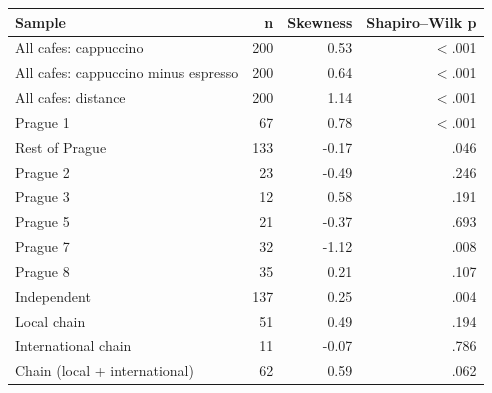 \begin{tabular}{lrrr}
  \toprule
Sample & n & Skewness & Shapiro--Wilk p \\ 
  \midrule
All cafes: cappuccino & 200 & 0.53 & $<$.001 \\ 
  All cafes: cappuccino minus espresso & 200 & 0.64 & $<$.001 \\ 
  All cafes: distance & 200 & 1.14 & $<$.001 \\ 
  Prague 1 & 67 & 0.78 & $<$.001 \\ 
  Rest of Prague & 133 & -0.17 & .046 \\ 
  Prague 2 & 23 & -0.49 & .246 \\ 
  Prague 3 & 12 & 0.58 & .191 \\ 
  Prague 5 & 21 & -0.37 & .693 \\ 
  Prague 7 & 32 & -1.12 & .008 \\ 
  Prague 8 & 35 & 0.21 & .107 \\ 
  Independent & 137 & 0.25 & .004 \\ 
  Local chain & 51 & 0.49 & .194 \\ 
  International chain & 11 & -0.07 & .786 \\ 
  Chain (local + international) & 62 & 0.59 & .062 \\ 
   \bottomrule
\end{tabular}
